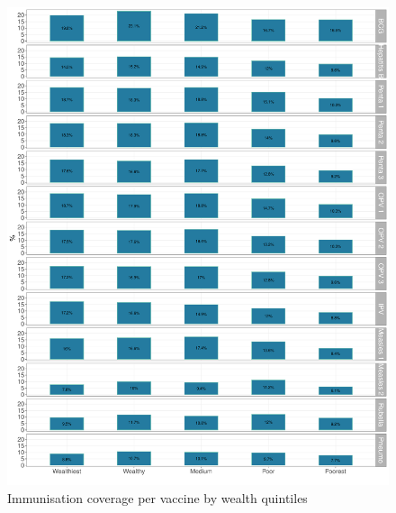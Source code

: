 \documentclass[12pt,a4paper]{article}
\begin{document}
\begin{figure}[H]

{\centering \includegraphics{kayinReport_files/figure-latex/epi4plot-1} 

}

\caption{Immunisation coverage per vaccine by wealth quintiles}\label{fig:epi4plot}
\end{figure}
\end{document}
